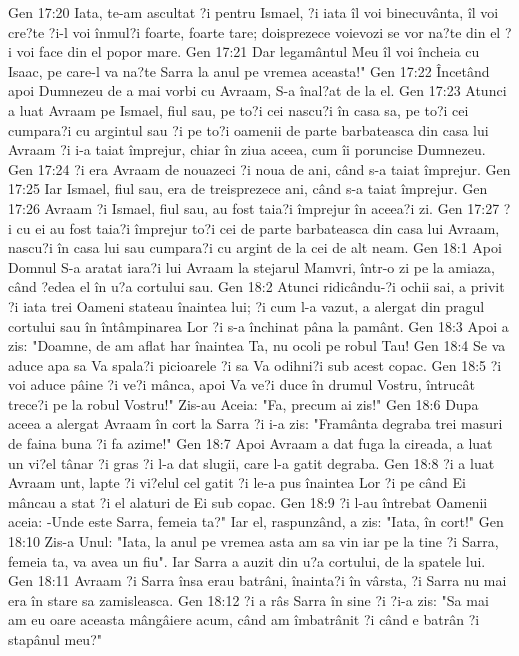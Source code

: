 Gen 17:20  Iata, te-am ascultat ?i pentru Ismael, ?i iata îl voi binecuvânta, îl voi cre?te ?i-l voi înmul?i foarte, foarte tare; doisprezece voievozi se vor na?te din el ?i voi face din el popor mare.
Gen 17:21  Dar legamântul Meu îl voi încheia cu Isaac, pe care-l va na?te Sarra la anul pe vremea aceasta!"
Gen 17:22  Încetând apoi Dumnezeu de a mai vorbi cu Avraam, S-a înal?at de la el.
Gen 17:23  Atunci a luat Avraam pe Ismael, fiul sau, pe to?i cei nascu?i în casa sa, pe to?i cei cumpara?i cu argintul sau ?i pe to?i oamenii de parte barbateasca din casa lui Avraam ?i i-a taiat împrejur, chiar în ziua aceea, cum îi poruncise Dumnezeu.
Gen 17:24  ?i era Avraam de nouazeci ?i noua de ani, când s-a taiat împrejur.
Gen 17:25  Iar Ismael, fiul sau, era de treisprezece ani, când s-a taiat împrejur.
Gen 17:26  Avraam ?i Ismael, fiul sau, au fost taia?i împrejur în aceea?i zi.
Gen 17:27  ?i cu ei au fost taia?i împrejur to?i cei de parte barbateasca din casa lui Avraam, nascu?i în casa lui sau cumpara?i cu argint de la cei de alt neam.
Gen 18:1  Apoi Domnul S-a aratat iara?i lui Avraam la stejarul Mamvri, într-o zi pe la amiaza, când ?edea el în u?a cortului sau.
Gen 18:2  Atunci ridicându-?i ochii sai, a privit ?i iata trei Oameni stateau înaintea lui; ?i cum l-a vazut, a alergat din pragul cortului sau în întâmpinarea Lor ?i s-a închinat pâna la pamânt.
Gen 18:3  Apoi a zis: "Doamne, de am aflat har înaintea Ta, nu ocoli pe robul Tau!
Gen 18:4  Se va aduce apa sa Va spala?i picioarele ?i sa Va odihni?i sub acest copac.
Gen 18:5  ?i voi aduce pâine ?i ve?i mânca, apoi Va ve?i duce în drumul Vostru, întrucât trece?i pe la robul Vostru!" Zis-au Aceia: "Fa, precum ai zis!"
Gen 18:6  Dupa aceea a alergat Avraam în cort la Sarra ?i i-a zis: "Framânta degraba trei masuri de faina buna ?i fa azime!"
Gen 18:7  Apoi Avraam a dat fuga la cireada, a luat un vi?el tânar ?i gras ?i l-a dat slugii, care l-a gatit degraba.
Gen 18:8  ?i a luat Avraam unt, lapte ?i vi?elul cel gatit ?i le-a pus înaintea Lor ?i pe când Ei mâncau a stat ?i el alaturi de Ei sub copac.
Gen 18:9  ?i l-au întrebat Oamenii aceia: -Unde este Sarra, femeia ta?" Iar el, raspunzând, a zis: "Iata, în cort!"
Gen 18:10  Zis-a Unul: "Iata, la anul pe vremea asta am sa vin iar pe la tine ?i Sarra, femeia ta, va avea un fiu". Iar Sarra a auzit din u?a cortului, de la spatele lui.
Gen 18:11  Avraam ?i Sarra însa erau batrâni, înainta?i în vârsta, ?i Sarra nu mai era în stare sa zamisleasca.
Gen 18:12  ?i a râs Sarra în sine ?i ?i-a zis: "Sa mai am eu oare aceasta mângâiere acum, când am îmbatrânit ?i când e batrân ?i stapânul meu?"
